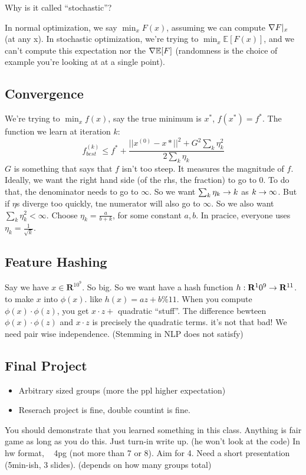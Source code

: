 Why is it called ``stochastic''?

In normal optimization, we say $\min_x F(x)$, assuming we can compute
$\nabla F|_x$ (at any x).
In stochastic optimization, we're trying to $\min_x \mathbb{E}[F(x)]$,
and we can't compute this expectation nor the $\nabla \mathbb{E}[F]$
(randomness is the choice of example you're looking at at a single
point). 

\subsection{Convergence}
We're trying to $\min_x f(x)$, say the true minimum is $x^*$, $f(x^*)
= f^*$. The function we learn at iteration $k$:
$$f^{(k)}_{best} \le f^{*} + \frac{|| x^{(0)}-x*  ||^2 + G^2
  \sum_k\eta_k^2}{2\sum_k \eta_k}$$
$G$ is something that says that $f$ isn't too steep. It measures the
magnitude of $f$.
Ideally, we want the right hand side (of the rhs, the fraction) to go
to 0. To do that, the denominator needs to go to $\infty$. So we want
$\sum_k \eta_k \rightarrow k$ as $k\rightarrow \infty$. But if $\eta$s diverge too
quickly, tne numerator will also go to $\infty$. So we also want
$\sum_k \eta_k^2 < \infty$. Choose $\eta_k = \frac{a}{b+k}$, for some
constant $a,b$. In pracice, everyone uses $\eta_k =
\frac{1}{\sqrt{k}}$.

\subsection{Feature Hashing}
\label{sec:featurehashing}
Say we have $x\in \mathbf{R}^{10^9}$. So big. So we want have a hash
 function $h: \mathbf{R}^10^9 \rightarrow \mathbf{R}^{11}$. to make $x$ into $\phi(x)$.
 like $h(x) = az+b\%11$.
When you compute $\phi(x)\cdot \phi(z)$, you get $x\cdot z +$
quadratic ``stuff''. The difference bewteen $\phi(x)\cdot \phi(z)$ and
$x\cdot z$ is precisely the quadratic terms. it's not that bad! We
need pair wise independence. (Stemming in NLP does not satisfy)

\subsection{Final Project}
\label{sec:finalproject}
\begin{itemize}
\item Arbitrary sized groups (more the ppl higher expectation)
\item Reserach project is fine, double countint is fine.
\end{itemize}
You should demonstrate that you learned something in this
class. Anything is fair game as long as you do this. Just turn-in
write up. (he won't look at the code) In hw format, ~ 4pg (not more
than 7 or 8). Aim for 4.
Need a short presentation (5min-ish, 3 slides). (depends on how many
groups total)

